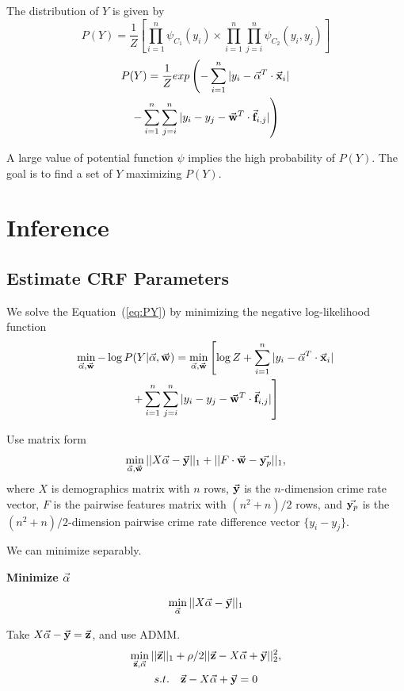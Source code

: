 The distribution of $Y$ is given by 
\begin{equation}
	P(Y) =  \frac{1}{Z} \left[ \prod_{i=1}^n \psi_{C_1}(y_i) \times \prod_{i=1}^n \prod_{j=i}^n \psi_{C_2}(y_i, y_j) \right]
\end{equation}
\begin{multline}
	P(Y) =  \frac{1}{Z} exp  \left( - \sum_{i=1}^n |y_i - \vec{\mathbf{\alpha}}^T \cdot \vec{\mathbf{x}}_i| \right. \\
          \left. - \sum_{i=1}^n\sum_{j=i}^n |y_i - y_j - \vec{\mathbf{w}}^T \cdot \vec{\mathbf{f}}_{i,j}| \right)
	\label{eq:PY}
\end{multline}


A large value of  potential function $\psi$ implies the high probability of $P(Y)$. The goal is to find a set of $Y$ maximizing $P(Y)$. 


\section{Inference}


\subsection{Estimate CRF Parameters}
\label{sec:estim}


We solve the Equation~(\ref{eq:PY}) by minimizing the negative log-likelihood function
\begin{multline}
\min_{\vec{\mathbf{\alpha}}, \vec{\mathbf{w}}} -\log P(Y|\vec{\mathbf{\alpha}}, \vec{\mathbf{w}}) = \min_{\vec{\mathbf{\alpha}}, \vec{\mathbf{w}}} \left[ \log Z + \sum_{i=1}^n |y_i - \vec{\mathbf{\alpha}}^T \cdot \vec{\mathbf{x}}_i| \right. \\
\left.  + \sum_{i=1}^n\sum_{j=i}^n |y_i - y_j - \vec{\mathbf{w}}^T \cdot \vec{\mathbf{f}}_{i,j}| \right]
\end{multline}

Use matrix form
\[
\min_{\vec{\mathbf{\alpha}}, \vec{\mathbf{w}}} ||X \vec{\mathbf{\alpha}} - \vec{\mathbf{y}}||_1 + ||F \cdot \vec{\mathbf{w}} - \vec{\mathbf{y}_p}||_1,
\]
where $X$ is demographics matrix with $n$ rows, $\vec{\mathbf{y}}$ is the $n$-dimension crime rate vector, $F$ is the pairwise features matrix with $(n^2+n)/2$  rows, and $\vec{\mathbf{y}_p}$ is the $(n^2+n)/2$-dimension pairwise crime rate difference vector $\{y_i- y_j\}$.

We can minimize separably.



\textbf{Minimize $\vec{\mathbf{\alpha}}$}

\[ \min_{\vec{\mathbf{\alpha}}} ||X \vec{\mathbf{\alpha}} - \vec{\mathbf{y}}||_1 \]

Take $X\vec{\mathbf{\alpha}} - \vec{\mathbf{y}} = \vec{\mathbf{z}}$, and use ADMM.
\begin{multline}
 \min_{\vec{\mathbf{z}}, \vec{\mathbf{\alpha}}}  ||\vec{\mathbf{z}}||_1 + \rho/2 ||\vec{\mathbf{z}} - X\vec{\mathbf{\alpha}} + \vec{\mathbf{y}}||_2^2,\\
   s.t.\quad  \vec{\mathbf{z}} - X\vec{\mathbf{\alpha}} + \vec{\mathbf{y}} = 0 
\end{multline}

